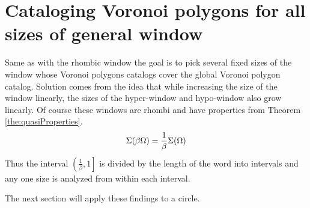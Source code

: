 \documentclass[text.tex]{subfiles}
\begin{document}
\section{Cataloging Voronoi polygons for all sizes of general window}
Same as with the rhombic window the goal is to pick several fixed sizes of the window whose Voronoi polygons catalogs cover the global Voronoi polygon catalog. Solution comes from the idea that while increasing the size of the window linearly, the sizes of the hyper-window and hypo-window also grow linearly. Of course these windows are rhombi and have properties from Theorem \ref{the:quasiProperties}.
$$\Sigma(\beta\Omega) = \frac{1}{\beta}\Sigma(\Omega) $$
Thus the interval $\left(\frac{1}{\beta},1\right]$ is divided by the length of the word into intervals and any one size is analyzed from within each interval. 

The next section will apply these findings to a circle. 
\end{document}
